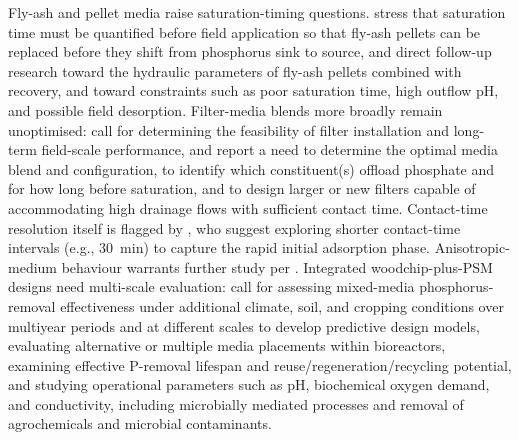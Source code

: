 \documentclass[11pt]{article}
\begin{document}
Fly-ash and pellet media raise saturation-timing questions. \textcite{Li2017} stress that saturation time must be quantified before field application so that fly-ash pellets can be replaced before they shift from phosphorus sink to source, and \textcite{Li2018b} direct follow-up research toward the hydraulic parameters of fly-ash pellets combined with recovery, and toward constraints such as poor saturation time, high outflow pH, and possible field desorption. Filter-media blends more broadly remain unoptimised: \textcite{Agrawal2011} call for determining the feasibility of filter installation and long-term field-scale performance, and \textcite{Agrawal2011b} report a need to determine the optimal media blend and configuration, to identify which constituent(s) offload phosphate and for how long before saturation, and to design larger or new filters capable of accommodating high drainage flows with sufficient contact time. Contact-time resolution itself is flagged by \textcite{Kumari2025}, who suggest exploring shorter contact-time intervals (e.g., 30~min) to capture the rapid initial adsorption phase. Anisotropic-medium behaviour warrants further study per \textcite{Kankarej2023}. Integrated woodchip-plus-PSM designs need multi-scale evaluation: \textcite{Husk2018} call for assessing mixed-media phosphorus-removal effectiveness under additional climate, soil, and cropping conditions over multiyear periods and at different scales to develop predictive design models, evaluating alternative or multiple media placements within bioreactors, examining effective P-removal lifespan and reuse/regeneration/recycling potential, and studying operational parameters such as pH, biochemical oxygen demand, and conductivity, including microbially mediated processes and removal of agrochemicals and microbial contaminants.
\end{document}
